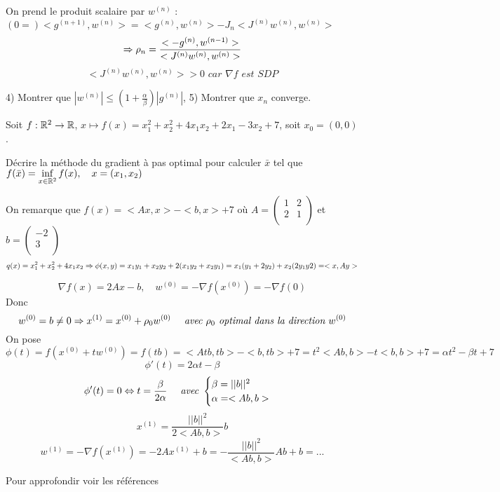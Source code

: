 On prend le produit scalaire par $w^{(n)}$ : $(0=)<g^{(n+1)},w^{(n)}>=<g^{(n)},w^{(n)}>-J_n<J^{(n)}w^{(n)},w^{(n)}>$
\[ \Rightarrow\rho_n = \frac{ <-g^{(n)},w^{(n-1)}> }{ <J^{(n)}w^{(n)},w^{(n)}>} \]
\[ <J^{(n)}w^{(n)},w^{(n)}> >0 \textit{ car } \nabla f \textit{ est SDP}\]

4) Montrer que $|w^{(n)}| \leq (1+\frac{\alpha}{\beta})|g^{(n)}|$,
5) Montrer que $x_n$ converge.

\begin{exemple}
Soit $f:\mathbb{R}^2\rightarrow\mathbb{R}$, $x\mapsto f(x)=x_1^2+x_2^2+4x_1x_2+2x_1-3x_2+7$, soit $x_0=(0,0)$.

Décrire la méthode du gradient à pas optimal pour calculer $\bar{x}$ tel que $\displaystyle f(\bar{x})=\inf_{x\in\mathbb{R}^2} f(x), \quad x=(x_1,x_2)$

On remarque que $f(x)=<Ax,x>-<b,x>+7$ où $A=\begin{pmatrix}1 & 2\\ 2 & 1\\ \end{pmatrix}$ et $b=\begin{pmatrix}-2\\ 3\\ \end{pmatrix}$
\[q(x)=x_1^2+x_2^2+4x_1x_2 \Rightarrow \phi(x, y)=x_1y_1+x_2y_2+2(x_1y_2+x_2y_1)=x_1(y_1+2y_2)+x_2(2y_1y2)=<x,Ay>\]

\[\nabla f(x)=2Ax-b, \quad w^{(0)}=-\nabla f(x^{(0)})=-\nabla f(0)\]
Donc \[w^{(0)}=b\ne 0 \Rightarrow x^{(1)}=x^{(0)}+\rho_0w^{(0)}\quad \textit{ avec }\rho_0 \textit{ optimal dans la direction }w^{(0)}\]
On pose \[\phi(t)=f(x^{(0)}+tw^{(0)})=f(tb)=<Atb,tb>-<b,tb>+7=t^2<Ab,b>-t<b,b>+7=\alpha t^2-\beta t+7 \]
\[\phi'(t)=2\alpha t-\beta\]
\[\phi'(t)=0 \Leftrightarrow t=\frac{\beta}{2\alpha}\quad\textit{ avec }\begin{cases} \beta=||b||^2 \\ \alpha=<Ab,b> \end{cases}\]
\[x^{(1)}=\frac{||b||^2}{2<Ab,b>}b\]
\[w^{(1)}=-\nabla f(x^{(1)})=-2Ax^{(1)}+b=-\frac{||b||^2}{<Ab,b>}Ab+b= ...\]

\end{exemple}



Pour approfondir voir les références \cite{minoux} \cite{bierlaine} \cite{luenberger}






